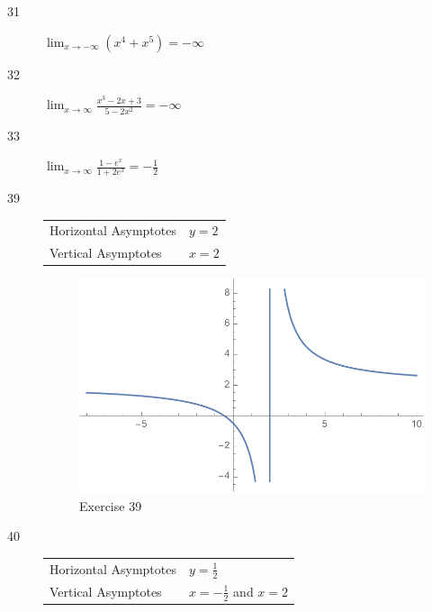 \documentclass[letterpaper, landscape]{exam}
\begin{document}
\begin{description}
      \item[31] 
        $\lim_{x \to -\infty} \left( x^4 + x^5 \right) = \boxed{ -\infty }$

      \item[32] 
        $\lim_{x \to \infty} \frac{x^3 - 2x + 3}{5 - 2x^2} = \boxed{ -\infty }$

      \item[33] 
        $\lim_{x \to \infty} \frac{1 - e^x}{1 + 2e^x} = \boxed{ - \frac{1}{2} }$

      \newpage

      \item[39]
        \begin{tabular}[H]{ll}
          \toprule
          Horizontal Asymptotes & $y = 2$ \\
          Vertical Asymptotes   & $x = 2$ \\
          \bottomrule
        \end{tabular}

        \begin{figure}[H]
          \centering
          \includegraphics[scale = 0.5]{ex39.pdf}
          \caption{Exercise 39}
          \label{fig:ex39}
        \end{figure}

      \item[40]
        \begin{tabular}[H]{ll}
          \toprule
          Horizontal Asymptotes & $y = \frac{1}{2}$ \\
          Vertical Asymptotes   & $x = - \frac{1}{2}$ and $x = 2$ \\
          \bottomrule
        \end{tabular}


\end{description}
\end{document}
